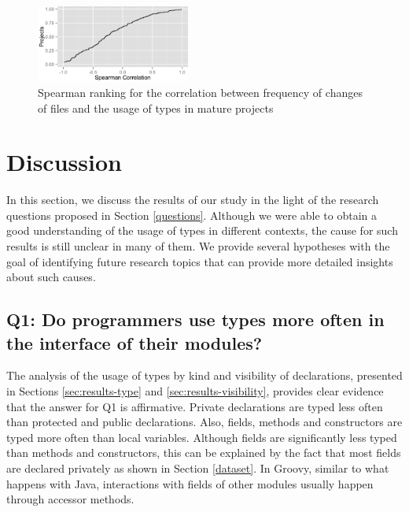 \documentclass[]{sigplanconf}
\begin{document}
\begin{figure}[h]
\centering \includegraphics[width=0.45\textwidth]{../analysis/result/change_commits_distribution.png} 
\caption{Spearman ranking for the correlation between frequency of changes of files and the usage of types in mature projects}
\label{fig:change_spearman} 
\end{figure}






















%
%
\section{Discussion\label{discussion}}
In this section, we discuss the results of our study in the light of the research questions proposed in Section \ref{questions}.
Although we were able to obtain a good understanding of the usage of types in different contexts, the cause for such results is still unclear in many of them.
We provide several hypotheses with the goal of identifying future research topics that can provide more detailed insights about such causes.

\subsection*{Q1: Do programmers use types more often in the interface of their modules?\label{discussion-q1}}
The analysis of the usage of types by kind and visibility of declarations, presented in Sections \ref{sec:results-type} and \ref{sec:results-visibility}, provides clear evidence that the answer for Q1 is affirmative.
Private declarations are typed less often than protected and public declarations.
Also, fields, methods and constructors are typed more often than local variables.
Although fields are significantly less typed than methods and constructors, this can be explained by the fact that most fields are declared privately as shown in Section \ref{dataset}.
In Groovy, similar to what happens with Java, interactions with fields of other modules usually happen through accessor methods.
\end{document}
